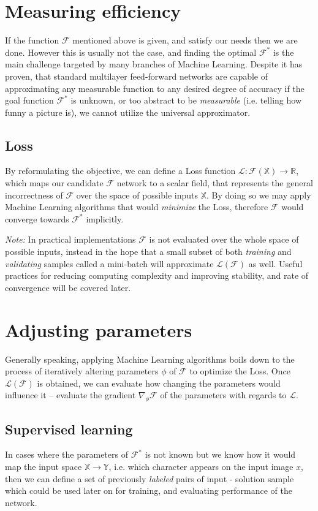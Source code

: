 \section{Measuring efficiency}
If the function $\mathcal{F}$ mentioned above is given, and satisfy our needs then we are done.
However this is usually not the case, and finding the optimal $\mathcal{F}^*$ is the main challenge targeted by many branches of Machine Learning.
Despite it has proven, that standard multilayer
feed-forward networks are capable of approximating
any measurable function to any desired degree of
accuracy \cite{hornik1989multilayer}
if the goal function $\mathcal{F}^*$ is unknown, 
or too abstract to be \emph{measurable} (i.e. telling how funny a picture is), 
we cannot utilize the universal approximator.

\subsection{Loss} 
By reformulating the objective, we can define a Loss function $\mathcal{L}:\mathcal{F}(\mathbb{X}) \rightarrow \mathbb{R}$,
which maps our candidate $\mathcal{F}$ network to a scalar field, that represents the general incorrectness of $\mathcal{F}$ over the space of possible inputs $\mathbb{X}$.
By doing so we may apply Machine Learning algorithms that would \emph{minimize} the Loss, therefore $\mathcal{F}$ would converge towards $\mathcal{F}^*$ implicitly.

\emph{Note:} In practical implementations $\mathcal{F}$ is not evaluated over the whole space of possible inputs, instead in the hope that a small subset of both \emph{training} and \emph{validating} samples called a mini-batch will approximate $\mathcal{L}(\mathcal{F})$ as well. Useful practices for reducing computing complexity and improving stability, and rate of convergence will be covered later.

\section{Adjusting parameters}
Generally speaking, applying Machine Learning algorithms boils down to the process of iteratively altering parameters $\phi$ of $\mathcal{F}$ to optimize the Loss.
Once $\mathcal{L}(\mathcal{F})$ is obtained, we can evaluate how changing the parameters would influence it -- evaluate the gradient $\nabla_\phi \mathcal{F}$ of the parameters  with regards to $\mathcal{L}$.

\subsection{Supervised learning}
In cases where the parameters of $\mathcal{F}^*$ is not known but we know how it would map the input space $\mathbb{X} \rightarrow \mathbb{Y}$, i.e. which character appears on the input image $x$, then we can define a set of previously \emph{labeled} pairs of input - solution sample which could be used later on for training, and evaluating performance of the network.

